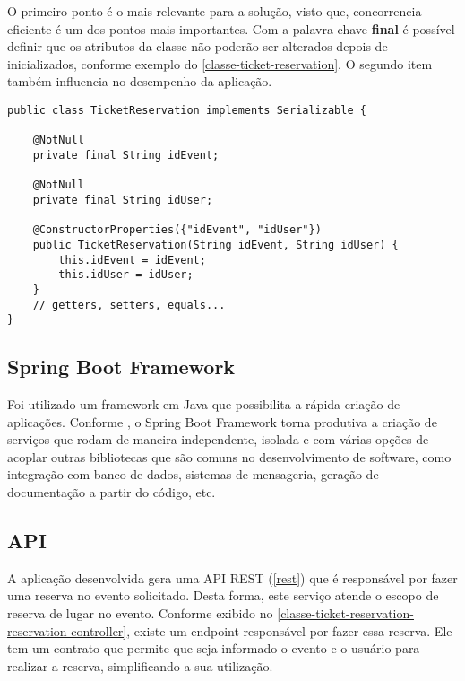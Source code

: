 
O primeiro ponto é o mais relevante para a solução, visto que, concorrencia
eficiente é um dos pontos mais importantes. Com a palavra chave \textbf{final} é
possível definir que os atributos da classe não poderão ser alterados depois
de inicializados, conforme exemplo do \autoref{classe-ticket-reservation}. O
segundo item também influencia no desempenho da aplicação.

\begin{lstlisting}[label=classe-ticket-reservation,caption=Classe TicketReservation em Java]
public class TicketReservation implements Serializable {

    @NotNull
    private final String idEvent;

    @NotNull
    private final String idUser;

    @ConstructorProperties({"idEvent", "idUser"})
    public TicketReservation(String idEvent, String idUser) {
        this.idEvent = idEvent;
        this.idUser = idUser;
    }
    // getters, setters, equals...
}
\end{lstlisting}

\subsection{Spring Boot Framework}

Foi utilizado um framework em Java que possibilita a rápida criação de aplicações.
Conforme \cite[8]{spring-boot-reference-guide}, o Spring Boot Framework torna
produtiva a criação de serviços que rodam de maneira independente, isolada
e com várias opções de acoplar outras bibliotecas que são comuns no desenvolvimento
de software, como integração com banco de dados, sistemas de mensageria, geração
de documentação a partir do código, etc.

\subsection{API}\label{api}

A aplicação desenvolvida gera uma API REST (\autoref{rest}) que é responsável por fazer uma reserva
no evento solicitado. Desta forma, este serviço atende o escopo de reserva de lugar no
evento. Conforme exibido no \autoref{classe-ticket-reservation-reservation-controller}, existe um endpoint responsável
por fazer essa reserva. Ele tem um contrato que permite que seja informado o evento e
o usuário para realizar a reserva, simplificando a sua utilização.

